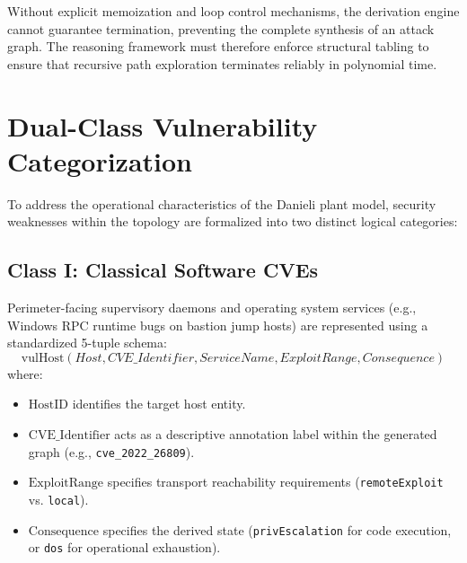 \documentclass[target=mst,aauheader=aics,style=]{thud}
\begin{document}
Without explicit memoization and loop control mechanisms, the derivation engine cannot guarantee termination, preventing the complete synthesis of an attack graph. The reasoning framework must therefore enforce structural tabling to ensure that recursive path exploration terminates reliably in polynomial time.

\section{Dual-Class Vulnerability Categorization}
To address the operational characteristics of the Danieli plant model, security weaknesses within the topology are formalized into two distinct logical categories:

\subsection{Class I: Classical Software CVEs}
Perimeter-facing supervisory daemons and operating system services (e.g., Windows RPC runtime bugs on bastion jump hosts) are represented using a standardized 5-tuple schema:
\begin{equation}
    \text{vulHost}(Host, CVE\_Identifier, ServiceName, ExploitRange, Consequence)
\end{equation}
where:
\begin{itemize}
    \item $\text{HostID}$ identifies the target host entity.
    \item $\text{CVE\_Identifier}$ acts as a descriptive annotation label within the generated graph (e.g., \texttt{cve\_2022\_26809}).
    \item $\text{ExploitRange}$ specifies transport reachability requirements (\texttt{remoteExploit} vs. \texttt{local}).
    \item $\text{Consequence}$ specifies the derived state (\texttt{privEscalation} for code execution, or \texttt{dos} for operational exhaustion).
\end{itemize}
\end{document}
